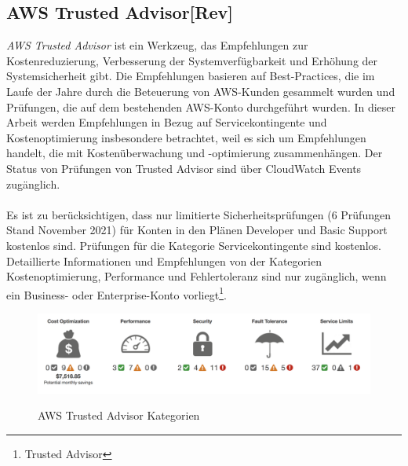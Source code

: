 \subsection{AWS Trusted Advisor[Rev]}
\textit{AWS Trusted Advisor} ist ein Werkzeug, das Empfehlungen zur Kostenreduzierung, Verbesserung der Systemverfügbarkeit und Erhöhung der Systemsicherheit gibt. Die Empfehlungen basieren auf Best-Practices, die im Laufe der Jahre durch die Beteuerung von AWS-Kunden gesammelt wurden und Prüfungen, die auf dem bestehenden AWS-Konto durchgeführt wurden.
In dieser Arbeit werden Empfehlungen in Bezug auf Servicekontingente und Kostenoptimierung insbesondere betrachtet, weil es sich um Empfehlungen handelt, die mit Kostenüberwachung und -optimierung zusammenhängen. Der Status von Prüfungen von Trusted Advisor sind über CloudWatch Events zugänglich. 
\\\\
Es ist zu berücksichtigen, dass nur limitierte Sicherheitsprüfungen (6 Prüfungen Stand November 2021) für Konten in den Plänen Developer und Basic Support kostenlos sind. Prüfungen für die Kategorie Servicekontingente sind kostenlos. Detaillierte Informationen und Empfehlungen von der Kategorien Kostenoptimierung, Performance und Fehlertoleranz sind nur zugänglich, wenn ein Business- oder Enterprise-Konto vorliegt\footnote{Trusted Advisor\cite{AMZ20}}. 
\\
\begin{figure}[h!]
      \centering
      \includegraphics[scale=0.4]{sources/AWS_Trusted_Advisor_Kategorien}
      \caption[AWS Trusted Advisor Kategorien]{}
      \label{fig:AWS_Trusted_Advisor_Kategorien} 
      AWS Trusted Advisor Kategorien\cite{AMZ20}
\end{figure}
